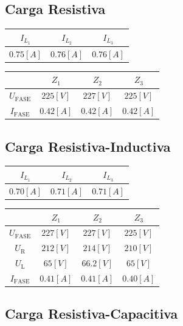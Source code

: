 \documentclass[letter,11pt]{article}
\begin{document}
\subsection{Carga Resistiva}

\begin{center}
    \begin{tabular}{|c|c|c|}
    \hline
    $I_{L_1}$ & $I_{L_2}$ & $I_{L_3}$
    \tabularnewline \hline \hline
    $0.75[A]$ & $0.76[A]$ & $0.76[A]$
    \tabularnewline \hline
    \end{tabular}
\end{center}

\begin{center}
    \begin{tabular}{|c||c|c|c|}
    \hline
    & $Z_{1}$ & $Z_{2}$ & $Z_{3}$
    \tabularnewline \hline \hline
    $U_{\text{FASE}}$ & $225[V]$ & $227[V]$ & $225[V]$
    \tabularnewline \hline
    $I_{\text{FASE}}$ & $0.42[A]$ & $0.42[A]$ & $0.42[A]$
    \tabularnewline \hline
    \end{tabular}
\end{center}

\subsection{Carga Resistiva-Inductiva}

\begin{center}
    \begin{tabular}{|c|c|c|}
    \hline
    $I_{L_1}$ & $I_{L_2}$ & $I_{L_3}$
    \tabularnewline \hline \hline
    $0.70[A]$ & $0.71[A]$ & $0.71[A]$
    \tabularnewline \hline
    \end{tabular}
\end{center}

\begin{center}
    \begin{tabular}{|c||c|c|c|}
    \hline
    & $Z_{1}$ & $Z_{2}$ & $Z_{3}$
    \tabularnewline \hline \hline
    $U_{\text{FASE}}$ & $227[V]$ & $227[V]$ & $225[V]$
    \tabularnewline \hline
    $U_{\text{R}}$ & $212[V]$ & $214[V]$ & $210[V]$
    \tabularnewline \hline
    $U_{\text{L}}$ & $65[V]$ & $66.2[V]$ & $65[V]$
    \tabularnewline \hline
    $I_{\text{FASE}}$ & $0.41[A]$ & $0.41[A]$ & $0.40[A]$
    \tabularnewline \hline
    \end{tabular}
\end{center}

\subsection{Carga Resistiva-Capacitiva}
\end{document}
